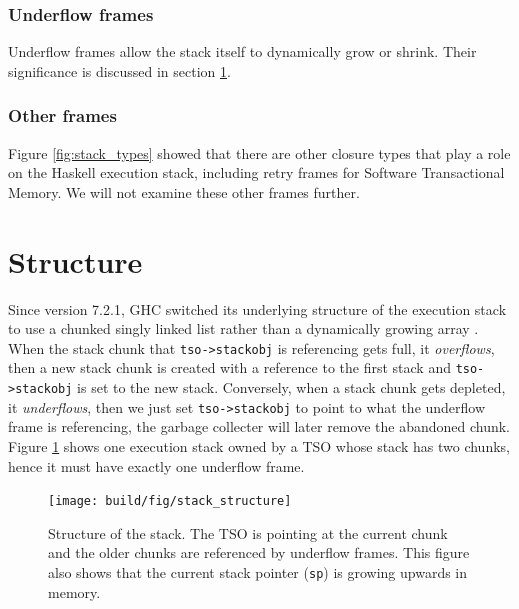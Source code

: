 \subsubsection{Underflow frames}

Underflow frames allow the stack itself to dynamically grow or
shrink. Their significance is discussed in section \ref{sec:structure_of_stack}.

\subsubsection{Other frames}

Figure \ref{fig:stack_types} showed that there are other closure types
that play a role on the Haskell execution stack, including retry frames
for Software Transactional Memory. We will not examine these other
frames further.

\section{Structure} \label{sec:structure_of_stack}

Since version 7.2.1, GHC switched its underlying structure of the
execution stack to use a chunked singly linked list rather than a
dynamically growing array \cite{ghc_blog_overhaul_of_stack_management}
\cite{ghc_changeset_stack_chunks}. When the stack chunk that
\texttt{tso->stackobj} is referencing gets full, it \emph{overflows},
then a new stack chunk is created with a reference to the first stack
and \texttt{tso->stackobj} is set to the new stack. Conversely, when
a stack chunk gets depleted, it \emph{underflows}, then we just
set \texttt{tso->stackobj} to point to what the underflow frame is
referencing, the garbage collecter will later remove the abandoned
chunk. Figure \ref{fig:stack_structure} shows one execution stack
owned by a TSO whose stack has two chunks, hence it must have exactly
one underflow frame.

\begin{figure}
\begin{mdframed}
  \texttt{[image: build/fig/stack\_structure]}
  \caption{Structure of the stack. The TSO is pointing at the current
  chunk and the older chunks are referenced by underflow frames. This
  figure also shows that the current stack pointer (\texttt{sp}) is
  growing upwards in memory.}
  \label{fig:stack_structure}
\end{mdframed}
\end{figure}

